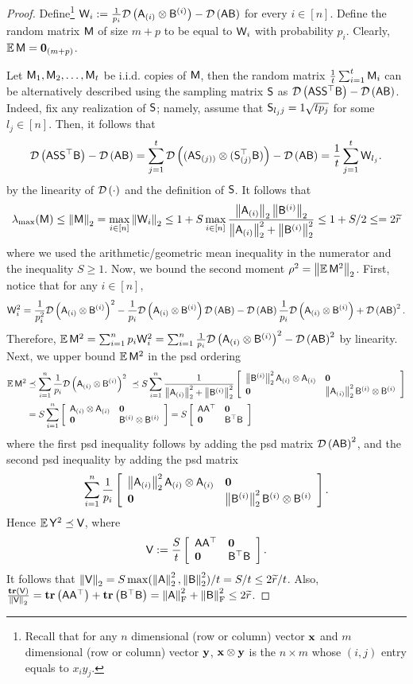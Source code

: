 \begin{proof}
Define\footnote{Recall that for any $n$ dimensional (row or column) vector $\x$ and $m$ dimensional (row or column) vector $\y$, $\x\otimes \y $ is the $n\times m$ whose $(i,j)$ entry equals to $x_i y_j$.} $\matW_i:= \frac1{p_i} \dil{\ac{i} \otimes \Br{i}} - \dil{\matA \matB}$ for every $i\in{[n]}$. Define the random matrix $\matM$ of size $m+p$ to be equal to $\matW_i$ with probability $p_i$. Clearly, $\EE \matM = \zeromtx_{(m+p)}$.

Let $\matM_1,\matM_2, \ldots , \matM_t$ be i.i.d. copies of $\matM$, then the random matrix $\frac1{t} \sum_{i=1}^{t} \matM_i $ can be alternatively described using the sampling matrix $\matS$ as $\dil{\matA \matS \matS^\top \matB} - \dil{\matA \matB}$. Indeed, fix any realization of $\matS$; namely, assume that $\matS_{l_j j} = 1\sqrt{tp_j}$ for some $l_j\in{[n]}$. Then, it follows that
%
\[
\dil{\matA\matS \matS^\top \matB} -\dil{\matA\matB} = \sum_{j=1}^{t} \dil{(\matA \matS_{(j))} \otimes (\matS_{(j)}^\top \matB)} - \dil{\matA\matB} = \frac1{t} \sum_{j=1}^{t} \matW_{l_j}.
\]
by the linearity of $\dil{\cdot}$ and the definition of $\matS$.
%
It follows that
\[\lambda_{\max}(\matM) \leq \norm{\matM} = \max_{i\in{[n]}} \norm{\matW_i} \leq 1 + S \max_{i\in{[n]}} \frac{\norm{\ac{i}}\norm{\Br{i}}}{\norm{\ac{i}}^2 +\norm{\Br{i}}^2} \leq 1 + S/2  \leq = 2 \widetilde{r}\]
where we used the arithmetic/geometric mean inequality in the numerator and the inequality $S\geq 1$. Now, we bound the second moment $\rho^2 = \norm{\EE \matM^2}$. First, notice that for any $i\in{[n]}$,
\[\matW_i^2 = \frac1{p_i^2} \dil{\ac{i} \otimes \Br{i}}^2 - \frac1{p_i}\dil{\ac{i} \otimes \Br{i}} \dil{\matA\matB} - \dil{\matA\matB}\frac1{p_i}\dil{\ac{i} \otimes \Br{i}} +\dil{\matA\matB}^2.\]
Therefore, $\EE\matM^2 = \sum_{i=1}^{n} p_i \matW_i^2 = \sum_{i=1}^{n}\frac1{p_i} \dil{\ac{i} \otimes \Br{i}}^2 - \dil{\matA\matB}^2 $ by linearity. Next, we upper bound $\EE\matM^2$ in the psd ordering
\begin{align*}
	\EE \matM^2 & \preceq \sum_{i=1}^{n}\frac1{p_i} \dil{\ac{i} \otimes \Br{i}}^2
				\ \preceq  S \sum_{i=1}^{n} \frac1{\norm{\ac{i}}^2 + \norm{\Br{i}}^2 } \myMat{\norm{\Br{i}}^2 \ac{i}\otimes \ac{i} }{\zeromtx}{\zeromtx}{\norm{\ac{i}}^2 \Br{i} \otimes \Br{i}}\\
				& =  S \sum_{i=1}^{n} \myMat{ \ac{i}\otimes \ac{i} }{\zeromtx}{\zeromtx}{\Br{i} \otimes \Br{i}} = S \myMat{ \matA \matA^\top}{\zeromtx}{\zeromtx}{\matB^\top \matB}
\end{align*}
where the first psd inequality follows by adding the psd matrix $\dil{\matA\matB}^2$, and the second psd inequality by adding the psd matrix
\[\sum_{i=1}^{n} \frac1{p_i} \myMat{\norm{\ac{i}}^2 \ac{i}\otimes \ac{i} }{\zeromtx}{\zeromtx}{\norm{\Br{i}}^2 \Br{i} \otimes \Br{i}}.\]
Hence $\EE \matY^2 \preceq \matV$, where
%
\[
\matV := \frac{S}{t} \myMat{\matA\matA^\top}{\zeromtx}{\zeromtx}{\matB^\top \matB}.
\]
%
It follows that $\norm{\matV} = S\max(\norm{\matA}^2, \norm{\matB}^2)/t  = S/t \leq 2\widetilde{r}/t$. Also, $\frac{\trace{\matV}}{\norm{\matV}} = \trace{\matA\matA^\top} + \trace{\matB^\top \matB} = \frobnorm{\matA}^2 + \frobnorm{\matB}^2 \leq 2\widetilde{r}$.


\end{proof}
